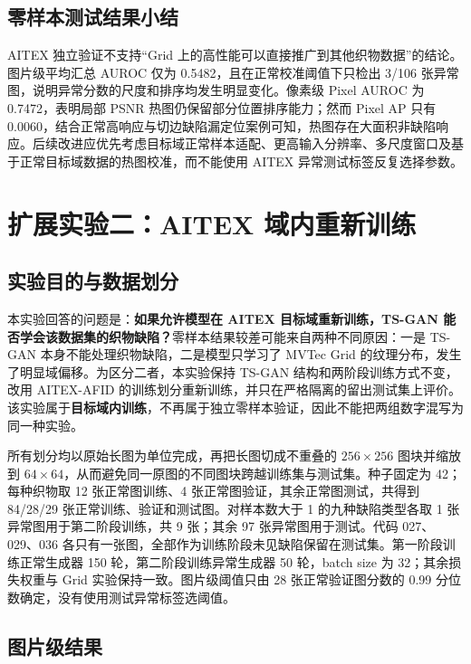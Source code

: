 \documentclass[UTF8,12pt]{ctexart}
\begin{document}
\subsection{零样本测试结果小结}

AITEX 独立验证不支持“Grid 上的高性能可以直接推广到其他织物数据”的结论。图片级平均汇总 AUROC 仅为 0.5482，且在正常校准阈值下只检出 3/106 张异常图，说明异常分数的尺度和排序均发生明显变化。像素级 Pixel AUROC 为 0.7472，表明局部 PSNR 热图仍保留部分位置排序能力；然而 Pixel AP 只有 0.0060，结合正常高响应与切边缺陷漏定位案例可知，热图存在大面积非缺陷响应。后续改进应优先考虑目标域正常样本适配、更高输入分辨率、多尺度窗口及基于正常目标域数据的热图校准，而不能使用 AITEX 异常测试标签反复选择参数。

\section{扩展实验二：AITEX 域内重新训练}

\subsection{实验目的与数据划分}

本实验回答的问题是：\textbf{如果允许模型在 AITEX 目标域重新训练，TS-GAN 能否学会该数据集的织物缺陷？}零样本结果较差可能来自两种不同原因：一是 TS-GAN 本身不能处理织物缺陷，二是模型只学习了 MVTec Grid 的纹理分布，发生了明显域偏移。为区分二者，本实验保持 TS-GAN 结构和两阶段训练方式不变，改用 AITEX-AFID 的训练划分重新训练，并只在严格隔离的留出测试集上评价。该实验属于\textbf{目标域内训练}，不再属于独立零样本验证，因此不能把两组数字混写为同一种实验。

所有划分均以原始长图为单位完成，再把长图切成不重叠的 $256\times256$ 图块并缩放到 $64\times64$，从而避免同一原图的不同图块跨越训练集与测试集。种子固定为 42；每种织物取 12 张正常图训练、4 张正常图验证，其余正常图测试，共得到 84/28/29 张正常训练、验证和测试图。对样本数大于 1 的九种缺陷类型各取 1 张异常图用于第二阶段训练，共 9 张；其余 97 张异常图用于测试。代码 027、029、036 各只有一张图，全部作为训练阶段未见缺陷保留在测试集。第一阶段训练正常生成器 150 轮，第二阶段训练异常生成器 50 轮，batch size 为 32；其余损失权重与 Grid 实验保持一致。图片级阈值只由 28 张正常验证图分数的 0.99 分位数确定，没有使用测试异常标签选阈值。

\subsection{图片级结果}
\end{document}
